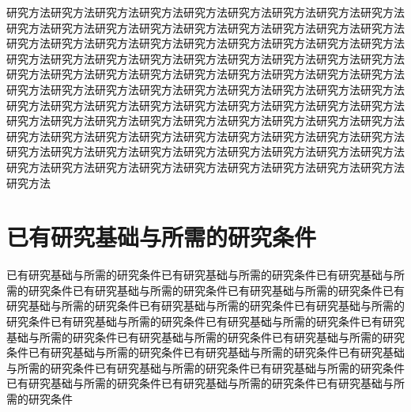 研究方法研究方法研究方法研究方法研究方法研究方法研究方法研究方法研究方法研究方法研究方法研究方法研究方法研究方法研究方法研究方法研究方法研究方法研究方法研究方法研究方法研究方法研究方法研究方法研究方法研究方法研究方法研究方法研究方法研究方法研究方法研究方法研究方法研究方法研究方法研究方法研究方法研究方法研究方法研究方法研究方法研究方法研究方法研究方法研究方法研究方法研究方法研究方法研究方法研究方法研究方法研究方法研究方法研究方法研究方法研究方法研究方法研究方法研究方法研究方法研究方法研究方法研究方法研究方法研究方法研究方法研究方法研究方法研究方法研究方法研究方法研究方法研究方法研究方法研究方法研究方法研究方法研究方法研究方法研究方法研究方法研究方法研究方法研究方法研究方法研究方法研究方法研究方法研究方法研究方法研究方法研究方法研究方法研究方法研究方法研究方法研究方法研究方法研究方法研究方法

\clearpage
\section{已有研究基础与所需的研究条件}
已有研究基础与所需的研究条件已有研究基础与所需的研究条件已有研究基础与所需的研究条件已有研究基础与所需的研究条件已有研究基础与所需的研究条件已有研究基础与所需的研究条件已有研究基础与所需的研究条件已有研究基础与所需的研究条件已有研究基础与所需的研究条件已有研究基础与所需的研究条件已有研究基础与所需的研究条件已有研究基础与所需的研究条件已有研究基础与所需的研究条件已有研究基础与所需的研究条件已有研究基础与所需的研究条件已有研究基础与所需的研究条件已有研究基础与所需的研究条件已有研究基础与所需的研究条件已有研究基础与所需的研究条件已有研究基础与所需的研究条件已有研究基础与所需的研究条件
\clearpage
\nocite{*}%
